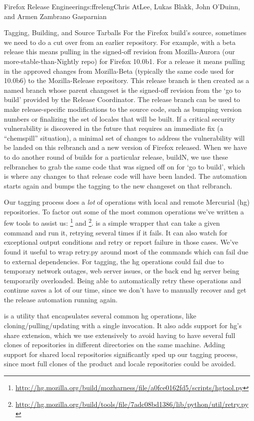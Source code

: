 \begin{aosachapter}{Firefox Release Engineering}{s:ffreleng}{Chris AtLee, Lukas Blakk, John O'Duinn, and Armen Zambrano Gasparnian}
\begin{aosasect1}{Tagging, Building, and Source Tarballs}
For the Firefox build's source, sometimes we need to do a cut over
from an earlier repository. For example, with a beta release this means
pulling in the signed-off revision from Mozilla-Aurora (our
more-stable-than-Nightly repo) for Firefox 10.0b1. For a release it
means pulling in the approved changes from Mozilla-Beta (typically the
same code used for 10.0b6) to the Mozilla-Release repository.  This release
branch is then created as a named branch whose parent changeset is
the signed-off revision from the `go to build' provided by the Release
Coordinator. The release branch can be used to make release-specific
modifications to the source code, such as bumping version numbers or
finalizing the set of locales that will be built. If a critical
security vulnerability is discovered in the future that requires an
immediate fix (a ``chemspill'' situation), a minimal set of changes to
address the vulnerability will be landed on this relbranch and a new
version of Firefox released. When we have to do another round of
builds for a particular release, buildN, we use these relbranches to
grab the same code that was signed off on for `go to build', which is
where any changes to that release code will have been landed. The
automation starts again and bumps the tagging to the new changeset on
that relbranch.
    
Our tagging process does a \emph{lot} of operations with local and
remote Mercurial (hg) repositories. To factor out some of the most
common operations we've written a few tools to assist us:
\footnote{\url{http://hg.mozilla.org/build/mozharness/file/a0fce0162fd5/scripts/hgtool.py}}
and
\footnote{\url{http://hg.mozilla.org/build/tools/file/7adc08bd1386/lib/python/util/retry.py}}.
 is a simple wrapper that can take a given command and
run it, retrying several times if it fails. It can also watch for
exceptional output conditions and retry or report failure in those
cases. We've found it useful to wrap retry.py around most of the
commands which can fail due to external dependencies.  For tagging,
the hg operations could fail due to temporary network outages, web
server issues, or the back end hg server being temporarily
overloaded. Being able to automatically retry these operations and
continue saves a lot of our time, since we don't have to manually
recover and get the release automation running again.
    
 is a utility that encapsulates several common hg
operations, like cloning/pulling/updating with a single invocation. It
also adds support for hg's share extension, which we use extensively
to avoid having to have several full clones of repositories in
different directories on the same machine.  Adding support for shared
local repositories significantly sped up our tagging process, since most
full clones of the product and locale repositories could be avoided.
    

\end{aosasect1}
\end{aosachapter}

